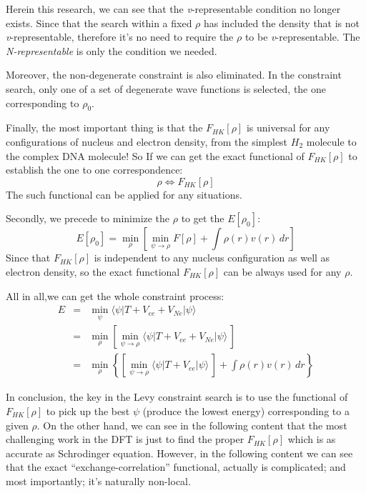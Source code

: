 Herein this research, we can see that the \textit{v}-representable
condition no longer exists. Since that the search within a fixed
$\rho$ has included the density that is not \textit{v}-representable,
therefore it's no need to require the $\rho$ to be
\textit{v}-representable. The \emph{N-representable} is only the
condition we needed.

Moreover, the non-degenerate constraint is also eliminated. In the
constraint search, only one of a set of degenerate wave functions is
selected, the one corresponding to $\rho_{0}$.

Finally, the most important thing is that the $F_{HK}[\rho]$ is
universal for any configurations of nucleus and electron density,
from the simplest $H_{2}$ molecule to the complex DNA molecule! So
If we can get the exact functional of $F_{HK}[\rho]$ to establish
the one to one correspondence:
\begin{equation}\label{}
\rho \Leftrightarrow F_{HK}[\rho]
\end{equation}
The such functional can be applied for any situations.

Secondly, we precede to minimize the $\rho$ to get the $E[\rho_{0}]$:
\begin{equation}\label{}
  E[\rho_{0}]=\min_{\rho}\left[\min_{\psi\rightarrow\rho} F[\rho] + \int
  \rho(r)v(r)\,dr\right]
\end{equation}
Since that $F_{HK}[\rho]$ is independent to any nucleus
configuration as well as electron density, so the exact functional
$F_{HK}[\rho]$ can be always used for any $\rho$.

All in all,we can get the whole constraint process:
\begin{eqnarray}
  E &=& \min_{\psi} \langle \psi|T+V_{ee}+V_{Ne}|\psi \rangle     \nonumber \\
  &=& \min_{\rho}\left[\min_{\psi\rightarrow\rho}\langle \psi
  |T+V_{ee}+V_{Ne}|\psi \rangle\,\right]     \nonumber \\
  &=& \min_{\rho}\left\{[\min_{\psi\rightarrow\rho}\langle \psi|T+V_{ee}|\psi
  \rangle\,] + \int \rho(r)v(r)\,dr \right\}
\end{eqnarray}

In conclusion, the key in the Levy constraint search is to use the
functional of $F_{HK}[\rho]$ to pick up the best $\psi$ (produce the
lowest energy) corresponding to a given $\rho$. On the other hand,
we can see in the following content that the most challenging work
in the DFT is just to find the proper $F_{HK}[\rho]$ which is as
accurate as Schrodinger equation. However, in the following content 
we can see that the exact ``exchange-correlation'' functional, actually
is complicated; and most importantly; it's naturally non-local. 

